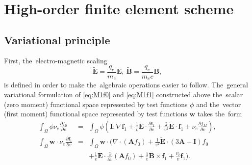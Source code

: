 \documentclass[review]{elsarticle}
\newcommand{\pdv}[2]{\frac{\partial{#1}}{\partial{#2}}}
\newcommand{\vect}[1]{\boldsymbol{#1}}
\newcommand{\matr}[1]{\mathbf{#1}}
\newcommand{\nue}{\nu_{e}}
\newcommand{\nutot}{\nu_{t}}
\newcommand{\vmag}{v}
\newcommand{\E}{\vect{E}}
\newcommand{\B}{\vect{B}}
\newcommand{\tE}{\vect{\tilde{E}}}
\newcommand{\tB}{\vect{\tilde{B}}}
\newcommand{\qe}{q_e}
\newcommand{\me}{m_e}
\newcommand{\fM}{f_M}
\newcommand{\fzero}{f_0}
\newcommand{\fone}{\vect{f}_1}
\newcommand{\MI}{\matr{I}}
\newcommand{\MA}{\matr{A}}
\newcommand{\intO}{\int_{\Omega}}
\begin{document}
\section{High-order finite element scheme}\label{sec:hos}

\subsection{Variational principle}
First, the~electro-magnetic scaling
\begin{equation}
  \tE = \frac{\qe}{\me}\E,~\tB = \frac{\qe}{\me c} \B,
\end{equation}
is defined in order to make the~algebraic operations easier to follow.
The~general variational formulation of \eqref{eq:M1f0} and \eqref{eq:M1f1} 
constructed above the~scalar (zero moment) functional space
represented by test functions $\phi$ and the~vector
(first moment) functional space represented by test functions $\vect{w}$ 
takes the~form
\begin{eqnarray}
  \intO\phi\nue\pdv{\fzero}{\vmag} &=& 
  \intO\phi
  \left(\MI:\nabla\fone + 
  \frac{1}{\vmag}\tE\cdot\pdv{\fone}{\vmag}
  + \frac{2}{\vmag^2}\tE\cdot\fone + \nue \pdv{\fM}{\vmag}\right) , 
  \label{eq:M1hosf0_variational}\\
  \intO\vect{w}\cdot\nue\pdv{\fone}{\vmag} &=&
  \intO\vect{w}\cdot\Bigg(\nabla\cdot\left(\MA\fzero\right)  
  + \frac{1}{\vmag^2}\tE\cdot\left( 3\MA - \MI \right)\fzero
  \nonumber\\
  && 
  + \frac{1}{\vmag}\tE\cdot\pdv{}{\vmag}
  \left( \MA\fzero\right) + \frac{1}{\vmag}\tB\times\fone + 
  \frac{\nutot}{\vmag}\fone\Bigg) .
  \label{eq:M1hosf1_variational}
\end{eqnarray}
\end{document}
